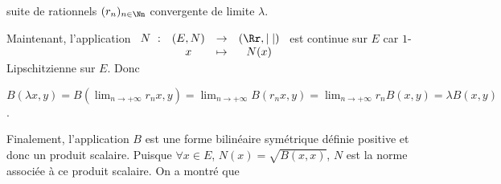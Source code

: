 {{suite de rationnels $(r_n)_{n\in\Nn}$ convergente de limite $\lambda$.

Maintenant, l'application $\begin{array}[t]{cccc}N~:&(E,N)&\rightarrow&(\Rr,|\;|)\\
 &x&\mapsto&N(x)
 \end{array}$ est continue sur $E$ car $1$-Lipschitzienne sur $E$. Donc
 
\begin{center}
$B(\lambda x,y) =B(\lim_{n \rightarrow +\infty}r_nx,y)=\lim_{n \rightarrow +\infty}B(r_nx,y)=\lim_{n \rightarrow +\infty}r_nB(x,y)=\lambda B(x,y)$.
\end{center}

Finalement, l'application $B$ est une forme bilinéaire symétrique définie positive et donc un produit scalaire. Puisque $\forall x\in E$, $N(x)=\sqrt{B(x,x)}$, $N$ est la norme associée à ce produit scalaire. On a montré que

\begin{center}
\end{center}}
}